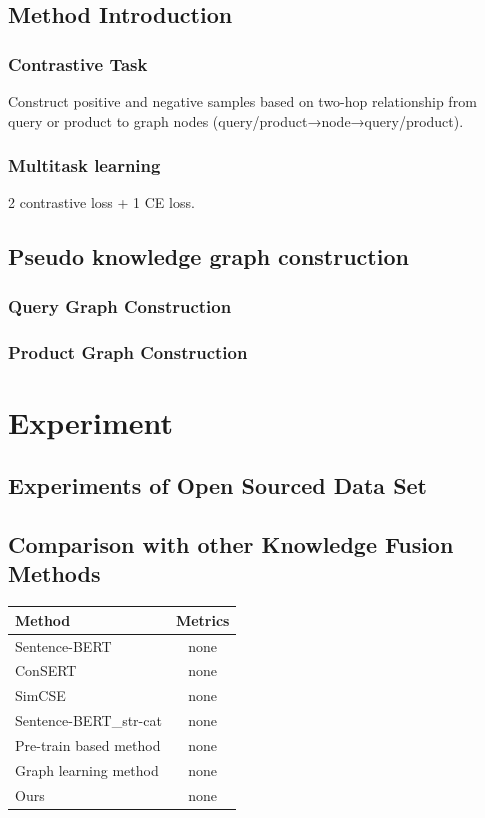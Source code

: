 \documentclass{article}
\begin{document}
\subsection{Method Introduction}
\subsubsection{Contrastive Task}
Construct positive and negative samples based on two-hop relationship from query or product to graph nodes (query/product→node→query/product).

\subsubsection{Multitask learning}
2 contrastive loss + 1 CE loss.

\subsection{Pseudo knowledge graph construction}
    \subsubsection{Query Graph Construction}
    \subsubsection{Product Graph Construction}


\section{Experiment}
\subsection{Experiments of Open Sourced Data Set}

\subsection{Comparison with other Knowledge Fusion Methods}

\begin{center}
\begin{tabular}{lc}
   \toprule
   \textbf{Method} & \textbf{Metrics}  \\
   \midrule
   Sentence-BERT & none  \\
   ConSERT & none  \\
   SimCSE & none  \\
   Sentence-BERT_{str-cat} & none  \\
   Pre-train based method & none  \\
   Graph learning method & none  \\
   Ours & none \\
   \bottomrule
\end{tabular}
\end{center}
\end{document}
